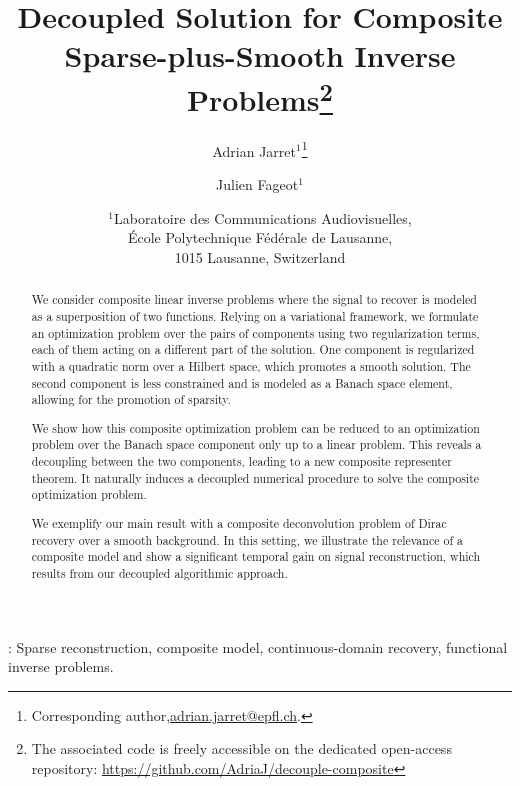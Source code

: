 \documentclass[12pt]{article}
\title{Decoupled Solution for Composite Sparse-plus-Smooth Inverse Problems\footnote{The associated code is freely accessible on the dedicated open-access repository: \url{https://github.com/AdriaJ/decouple-composite}}}
\author{Adrian Jarret$^1$\thanks{ Corresponding author,\url{adrian.jarret@epfl.ch}.} \and Julien Fageot$^1$}
\date{
	$^1${\small Laboratoire des Communications Audiovisuelles,\\ \'Ecole Polytechnique Fédérale de Lausanne,\\ 1015 Lausanne, Switzerland}%
}
\begin{document}
\maketitle

\begin{abstract}
    We consider composite linear inverse problems where the signal to recover is modeled as a superposition of two functions. 
    Relying on a variational framework, we formulate an optimization problem over the pairs of components using two regularization terms, each of them acting on a different part of the solution.
    One component is regularized with a quadratic norm over a Hilbert space, which promotes a smooth solution. The second component is less constrained and is modeled as a Banach space element, allowing for the promotion of sparsity.

    We show how this composite optimization problem can be reduced to an optimization problem over the Banach space component only up to a linear problem.
    This reveals a decoupling between the two components, leading to a new composite representer theorem.
    It naturally induces a decoupled numerical procedure to solve the composite optimization problem.

    We exemplify our main result with a composite deconvolution problem of Dirac recovery over a smooth background. In this setting, we illustrate the relevance of a composite model and show a significant temporal gain on signal reconstruction, which results from our decoupled algorithmic approach.
\end{abstract}

: Sparse reconstruction, composite model, continuous-domain recovery, functional inverse problems. 

\end{document}
